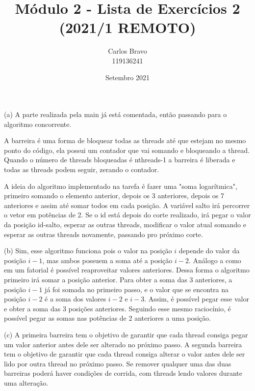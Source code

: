 \documentclass{homework}
\title{Módulo 2 - Lista de Exercícios 2 (2021/1 REMOTO)}
\author{Carlos Bravo\\ 119136241}
\date{Setembro 2021}
\begin{document}
\maketitle
\exercise*
(a) A parte realizada pela main já está comentada, então passando para o algoritmo concorrente.

A barreira é uma forma de bloquear todas as threads até que estejam no mesmo ponto do código, ela possui um contador que vai somando e bloqueando a thread. Quando o número de threads bloqueadas é nthreads-1 a barreira é liberada e todas as threads podem seguir, zerando o contador.

A ideia do algoritmo implementado na tarefa é fazer uma "soma logarítmica", primeiro somando o elemento anterior, depois os 3 anteriores, depois os 7 anteriores e assim até somar todos em cada posição. A variável salto irá percorrer o vetor em potências de 2. Se o id está depois do corte realizado, irá pegar o valor da posição id-salto, esperar as outras threads, modificar o valor atual somando e esperar as outras threads novamente, passando pro próximo corte.

(b) Sim, esse algoritmo funciona pois o valor na posição $i$ depende do valor da posição $i-1$, mas ambos possuem a soma até a posição $i-2$. Análogo a como em um fatorial é possível reaproveitar valores anteriores. Dessa forma o algoritmo primeiro irá somar a posição anterior. Para obter a soma das 3 anteriores, a posição $i-1$ já foi somada no primeiro passo, e o valor que se encontra na posição $i-2$ é a soma dos valores $i-2$ e $i-3$. Assim, é possível pegar esse valor e obter a soma das 3 posições anteriores. Seguindo esse mesmo raciocínio, é possível pegar as somas nas potências de 2 anteriores a uma posição.

(c) A primeira barreira tem o objetivo de garantir que cada thread consiga pegar um valor anterior antes dele ser alterado no próximo passo. A segunda barreira tem o objetivo de garantir que cada thread consiga alterar o valor antes dele ser lido por outra thread no próximo passo. Se remover qualquer uma das duas barreiras poderá haver condições de corrida, com threads lendo valores durante uma alteração.
\end{document}
